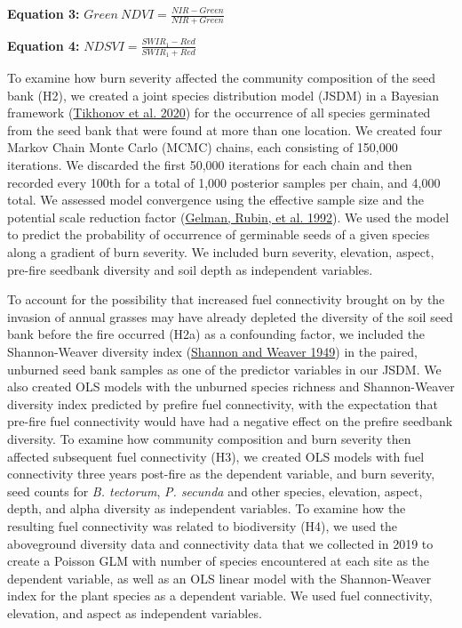 \documentclass[
  12pt,
]{article}
\begin{document}
\textbf{Equation 3:} \(Green~NDVI = \frac{NIR - Green}{NIR + Green}\)

\textbf{Equation 4:} \(NDSVI = \frac{SWIR_1 - Red}{SWIR_1 + Red}\)

To examine how burn severity affected the community composition of the
seed bank (H2), we created a joint species distribution model (JSDM) in
a Bayesian framework (\protect\hyperlink{ref-HMSC}{Tikhonov et al.
2020}) for the occurrence of all species germinated from the seed bank
that were found at more than one location. We created four Markov Chain
Monte Carlo (MCMC) chains, each consisting of 150,000 iterations. We
discarded the first 50,000 iterations for each chain and then recorded
every 100th for a total of 1,000 posterior samples per chain, and 4,000
total. We assessed model convergence using the effective sample size and
the potential scale reduction factor
(\protect\hyperlink{ref-Gelman1992}{Gelman, Rubin, et al. 1992}). We
used the model to predict the probability of occurrence of germinable
seeds of a given species along a gradient of burn severity. We included
burn severity, elevation, aspect, pre-fire seedbank diversity and soil
depth as independent variables.

To account for the possibility that increased fuel connectivity brought
on by the invasion of annual grasses may have already depleted the
diversity of the soil seed bank before the fire occurred (H2a) as a
confounding factor, we included the Shannon-Weaver diversity index
(\protect\hyperlink{ref-Shannon1949}{Shannon and Weaver 1949}) in the
paired, unburned seed bank samples as one of the predictor variables in
our JSDM. We also created OLS models with the unburned species richness
and Shannon-Weaver diversity index predicted by prefire fuel
connectivity, with the expectation that pre-fire fuel connectivity would
have had a negative effect on the prefire seedbank diversity. To examine
how community composition and burn severity then affected subsequent
fuel connectivity (H3), we created OLS models with fuel connectivity
three years post-fire as the dependent variable, and burn severity, seed
counts for \emph{B. tectorum}, \emph{P. secunda} and other species,
elevation, aspect, depth, and alpha diversity as independent variables.
To examine how the resulting fuel connectivity was related to
biodiversity (H4), we used the aboveground diversity data and
connectivity data that we collected in 2019 to create a Poisson GLM with
number of species encountered at each site as the dependent variable, as
well as an OLS linear model with the Shannon-Weaver index for the plant
species as a dependent variable. We used fuel connectivity, elevation,
and aspect as independent variables.
\end{document}
